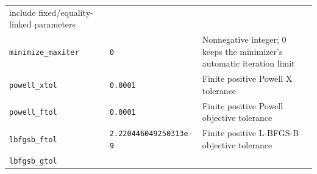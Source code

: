 \documentclass[
  10pt,
  a4paper,
  oneside]{scrreprt}
\begin{document}
\begin{longtable}[]{@{}lll@{}}
\begin{minipage}[t]{0.30\columnwidth}
include fixed/equality-linked parameters\strut
\end{minipage}\tabularnewline
\begin{minipage}[t]{0.30\columnwidth}\raggedright
\texttt{minimize\_maxiter}\strut
\end{minipage} & \begin{minipage}[t]{0.30\columnwidth}\raggedright
\texttt{0}\strut
\end{minipage} & \begin{minipage}[t]{0.30\columnwidth}\raggedright
Nonnegative integer; 0 keeps the minimizer's automatic iteration
limit\strut
\end{minipage}\tabularnewline
\begin{minipage}[t]{0.30\columnwidth}\raggedright
\texttt{powell\_xtol}\strut
\end{minipage} & \begin{minipage}[t]{0.30\columnwidth}\raggedright
\texttt{0.0001}\strut
\end{minipage} & \begin{minipage}[t]{0.30\columnwidth}\raggedright
Finite positive Powell X tolerance\strut
\end{minipage}\tabularnewline
\begin{minipage}[t]{0.30\columnwidth}\raggedright
\texttt{powell\_ftol}\strut
\end{minipage} & \begin{minipage}[t]{0.30\columnwidth}\raggedright
\texttt{0.0001}\strut
\end{minipage} & \begin{minipage}[t]{0.30\columnwidth}\raggedright
Finite positive Powell objective tolerance\strut
\end{minipage}\tabularnewline
\begin{minipage}[t]{0.30\columnwidth}\raggedright
\texttt{lbfgsb\_ftol}\strut
\end{minipage} & \begin{minipage}[t]{0.30\columnwidth}\raggedright
\texttt{2.220446049250313e-9}\strut
\end{minipage} & \begin{minipage}[t]{0.30\columnwidth}\raggedright
Finite positive L-BFGS-B objective tolerance\strut
\end{minipage}\tabularnewline
\begin{minipage}[t]{0.30\columnwidth}\raggedright
\texttt{lbfgsb\_gtol}\strut
\end{minipage} & \begin{minipage}[t]{0.30\columnwidth}\raggedright

\end{minipage}
\end{longtable}
\end{document}
